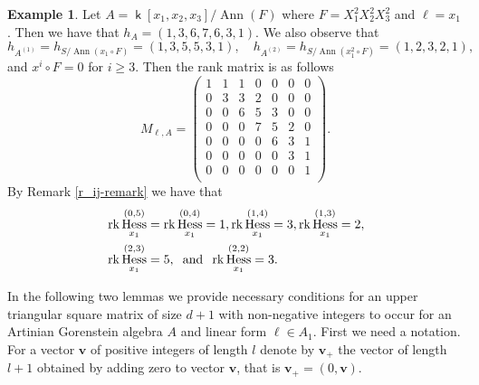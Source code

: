 \documentclass[12pt]{amsart}
\numberwithin{equation}{section}
\theoremstyle{plain} \newtheorem{theorem}{Theorem}[section]
\theoremstyle{definition} \newtheorem{definition}[theorem]{Definition}
\newtheorem{example}[theorem]{Example} \newtheorem{remark}[theorem]{Remark}
\DeclareMathOperator{\Hess}{Hess}\DeclareMathOperator{\rk}{rk}
\DeclareMathOperator{\ann}{Ann}\DeclareMathOperator{\Char}{char}
\DeclareMathOperator{\K}{\mathsf{k}}
\begin{document}
\begin{example}\label{firstEx}
Let $A=\K[x_1,x_2,x_3]/\ann(F)$ where $F=X_1^2X_2^2X_3^2$ and $\ell=x_1$. Then we have that 
$h_A=\left(1,3,6,7,6,3,1\right).$ We also observe that
$$h_{A^{(1)}}=h_{S/\ann(x_1\circ F)}=\left(1,3,5,5,3,1\right),\quad 
h_{A^{(2)}}=h_{S/\ann(x_1^2\circ F)}=\left(1,2,3,2,1\right),
$$
and $x^i\circ F=0$ for  $i\geq 3$.  Then the rank matrix is as follows 
$$M_{\ell,A}= \begin{pmatrix}
1&1&1&0&0&0&0\\
0&3&3&2&0&0&0\\
0&0&6&5&3&0&0\\
0&0&0&7&5&2&0\\
0&0&0&0&6&3&1\\
0&0&0&0&0&3&1\\
0&0&0&0&0&0&1\\
\end{pmatrix}.
$$
By Remark \ref{r_ij-remark} we have that
\begin{align*}
&\rk \Hess_{x_1}^{(0,5)}=\rk \Hess_{x_1}^{(0,4)}=1, \rk \Hess_{x_1}^{(1,4)}=3,\rk \Hess_{x_1}^{(1,3)}=2,\\
 & \rk \Hess_{x_1}^{(2,3)}=5,\hspace*{2mm}\text{and}\hspace*{2mm} \rk \Hess_{x_1}^{(2,2)}=3.
\end{align*}
\end{example}

In the following two lemmas we provide necessary conditions for an upper triangular square matrix of size $d+1$ with non-negative integers to occur for an Artinian Gorenstein algebra $A$ and linear form $\ell\in A_1$. First we need a notation. For a vector $\mathbf{v}$ of positive integers of length $l$ denote by $\mathbf{v}_+$ the vector of length $l+1$ obtained by adding zero to vector $\mathbf{v}$, that is $\mathbf{v}_+ = (0,\mathbf{v})$.
\end{document}
